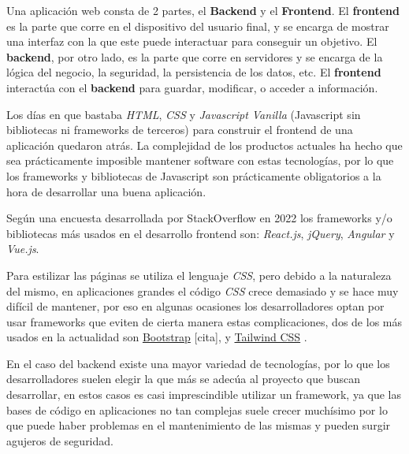Una aplicación web consta de 2 partes, el \textbf{Backend} y el \textbf{Frontend}. El \textbf{frontend} es la parte que corre en el dispositivo del usuario final, y se encarga de mostrar una interfaz con la que este puede interactuar para conseguir un objetivo. El \textbf{backend}, por otro lado, es la parte que corre en servidores y se encarga de la lógica del negocio, la seguridad, la persistencia de los datos, etc. El \textbf{frontend} interactúa con el \textbf{backend} para guardar, modificar, o acceder a información.
\newline

Los días en que bastaba \textit{HTML}, \textit{CSS} y \textit{Javascript Vanilla} (Javascript sin bibliotecas ni frameworks de terceros) para construir el frontend de una aplicación quedaron atrás. La complejidad de los productos actuales ha hecho que sea prácticamente imposible mantener software con estas tecnologías, por lo que los frameworks y bibliotecas de Javascript son prácticamente obligatorios a la hora de desarrollar una buena aplicación.
\newline

Según una encuesta desarrollada por StackOverflow \cite{encuesta2022} en 2022 los frameworks y/o bibliotecas más usados en el desarrollo frontend son: \textit{React.js}, \textit{jQuery}, \textit{Angular} y \textit{Vue.js}.
\newline

Para estilizar las páginas se utiliza el lenguaje \textit{CSS}, pero debido a la naturaleza del mismo, en aplicaciones grandes el código \textit{CSS} crece demasiado y se hace muy difícil de mantener, por eso en algunas ocasiones los desarrolladores optan por usar frameworks que eviten de cierta manera estas complicaciones, dos de los más usados en la actualidad son \href{getbootstrap.com}{Bootstrap} [cita], y \href{tailwindcss.com}{Tailwind CSS} \cite{tailwind}.
\newline

En el caso del backend existe una mayor variedad de tecnologías, por lo que los desarrolladores suelen elegir la que más se adecúa al proyecto que buscan desarrollar, en estos casos es casi imprescindible utilizar un framework, ya que las bases de código en aplicaciones no tan complejas suele crecer muchísimo por lo que puede haber problemas en el mantenimiento de las mismas y pueden surgir agujeros de seguridad.
\newline


